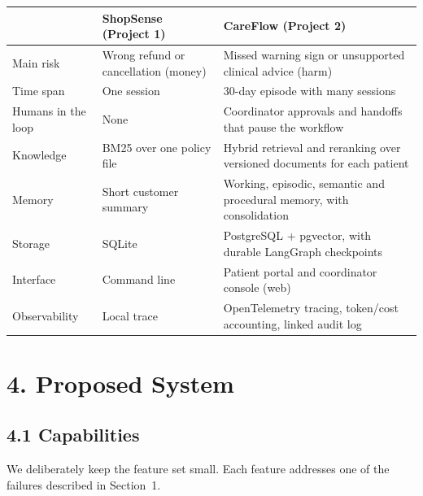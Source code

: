 \documentclass[11pt,a4paper]{article}
\begin{document}
\begin{center}
\small
\begin{tabularx}{\textwidth}{l L L}
\toprule
& \textbf{ShopSense (Project 1)} & \textbf{CareFlow (Project 2)} \\
\midrule
Main risk & Wrong refund or cancellation (money) & Missed warning sign or unsupported clinical advice (harm) \\
Time span & One session & 30-day episode with many sessions \\
Humans in the loop & None & Coordinator approvals and handoffs that pause the workflow \\
Knowledge & BM25 over one policy file & Hybrid retrieval and reranking over versioned documents for each patient \\
Memory & Short customer summary & Working, episodic, semantic and procedural memory, with consolidation \\
Storage & SQLite & PostgreSQL + pgvector, with durable LangGraph checkpoints \\
Interface & Command line & Patient portal and coordinator console (web) \\
Observability & Local trace & OpenTelemetry tracing, token/cost accounting, linked audit log \\
\bottomrule
\end{tabularx}
\end{center}

\section*{4. Proposed System}

\subsection*{4.1 Capabilities}

We deliberately keep the feature set small. Each feature addresses one of the failures described in Section~1.
\end{document}
